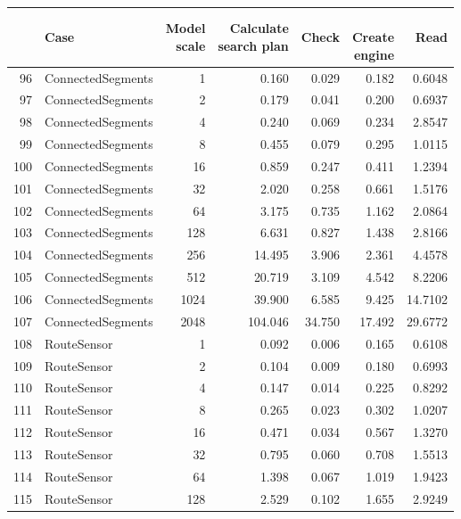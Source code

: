 \begin{table}[ht]
	\centering
	\begin{tabular}{rlrrrrr}
		\hline
		& Case & \shortstack{Model\\scale}  & \shortstack{Calculate\\search plan} & Check & \shortstack{\\Create\\engine} & Read\\ 
		\hline
		\hline
		96 & ConnectedSegments & 1 & 0.160 & 0.029 & 0.182 & 0.6048 \\ 
		97 & ConnectedSegments & 2 & 0.179 & 0.041 & 0.200 & 0.6937 \\ 
		98 & ConnectedSegments & 4 & 0.240 & 0.069 & 0.234 & 2.8547 \\ 
		99 & ConnectedSegments & 8 & 0.455 & 0.079 & 0.295 & 1.0115 \\ 
		100 & ConnectedSegments & 16 & 0.859 & 0.247 & 0.411 & 1.2394 \\ 
		101 & ConnectedSegments & 32 & 2.020 & 0.258 & 0.661 & 1.5176 \\ 
		102 & ConnectedSegments & 64 & 3.175 & 0.735 & 1.162 & 2.0864 \\ 
		103 & ConnectedSegments & 128 & 6.631 & 0.827 & 1.438 & 2.8166 \\ 
		104 & ConnectedSegments & 256 & 14.495 & 3.906 & 2.361 & 4.4578 \\ 
		105 & ConnectedSegments & 512 & 20.719 & 3.109 & 4.542 & 8.2206 \\ 
		106 & ConnectedSegments & 1024 & 39.900 & 6.585 & 9.425 & 14.7102 \\ 
		107 & ConnectedSegments & 2048 & 104.046 & 34.750 & 17.492 & 29.6772 \\
		\hline
		108 & RouteSensor & 1 & 0.092 & 0.006 & 0.165 & 0.6108 \\ 
		109 & RouteSensor & 2 & 0.104 & 0.009 & 0.180 & 0.6993 \\ 
		110 & RouteSensor & 4 & 0.147 & 0.014 & 0.225 & 0.8292 \\ 
		111 & RouteSensor & 8 & 0.265 & 0.023 & 0.302 & 1.0207 \\ 
		112 & RouteSensor & 16 & 0.471 & 0.034 & 0.567 & 1.3270 \\ 
		113 & RouteSensor & 32 & 0.795 & 0.060 & 0.708 & 1.5513 \\ 
		114 & RouteSensor & 64 & 1.398 & 0.067 & 1.019 & 1.9423 \\ 
		115 & RouteSensor & 128 & 2.529 & 0.102 & 1.655 & 2.9249 \\ 

\end{tabular}
\end{table}

